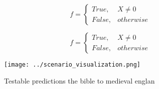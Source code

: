 \documentclass[a4paper]{article}
\begin{document}
\begin{equation}   f =
\begin{cases} True, & X \neq 0\\
False, & otherwise
\end{cases}
\end{equation}

\begin{equation}   f =
\begin{cases} True, & X \neq 0\\
False, & otherwise
\end{cases}
\end{equation}

\begin{figure}
\centering
\texttt{[image: ../scenario\_visualization.png]}
\caption{Testable predictions the bible to medieval englan
}
\end{figure}
 
\end{document}
